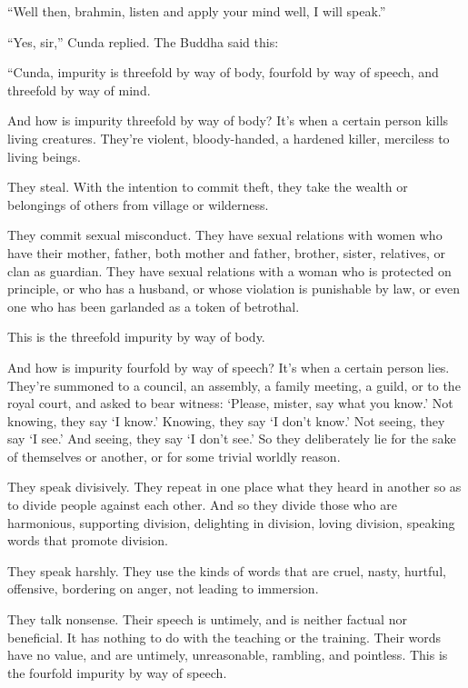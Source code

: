 \documentclass[12pt,openany]{book}%
\begin{document}
“Well then, brahmin, listen and apply your mind well, I will speak.” 

“Yes, sir,” Cunda replied. The Buddha said this: 

“Cunda, impurity is threefold by way of body, fourfold by way of speech, and threefold by way of mind. 

And how is impurity threefold by way of body? It’s when a certain person kills living creatures. They’re violent, bloody-handed, a hardened killer, merciless to living beings. 

They steal. With the intention to commit theft, they take the wealth or belongings of others from village or wilderness. 

They commit sexual misconduct. They have sexual relations with women who have their mother, father, both mother and father, brother, sister, relatives, or clan as guardian. They have sexual relations with a woman who is protected on principle, or who has a husband, or whose violation is punishable by law, or even one who has been garlanded as a token of betrothal. 

This is the threefold impurity by way of body. 

And how is impurity fourfold by way of speech? It’s when a certain person lies. They’re summoned to a council, an assembly, a family meeting, a guild, or to the royal court, and asked to bear witness: ‘Please, mister, say what you know.’ Not knowing, they say ‘I know.’ Knowing, they say ‘I don’t know.’ Not seeing, they say ‘I see.’ And seeing, they say ‘I don’t see.’ So they deliberately lie for the sake of themselves or another, or for some trivial worldly reason. 

They speak divisively. They repeat in one place what they heard in another so as to divide people against each other. And so they divide those who are harmonious, supporting division, delighting in division, loving division, speaking words that promote division. 

They speak harshly. They use the kinds of words that are cruel, nasty, hurtful, offensive, bordering on anger, not leading to immersion. 

They talk nonsense. Their speech is untimely, and is neither factual nor beneficial. It has nothing to do with the teaching or the training. Their words have no value, and are untimely, unreasonable, rambling, and pointless. This is the fourfold impurity by way of speech. 
\end{document}
